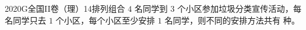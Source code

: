 
\begin{problem}{2020}{G}{全国II卷（理）}{14}{排列组合}
$ 4 $ 名同学到 $ 3 $ 个小区参加垃圾分类宣传活动，每名同学只去 $ 1 $ 个小区，每个小区至少安排 $ 1 $ 名同学，则不同的安排方法共有 \underline{\hspace{4em}} 种。
\end{problem}

\begin{answer}

\end{answer}

\begin{solutions}

\end{solutions}